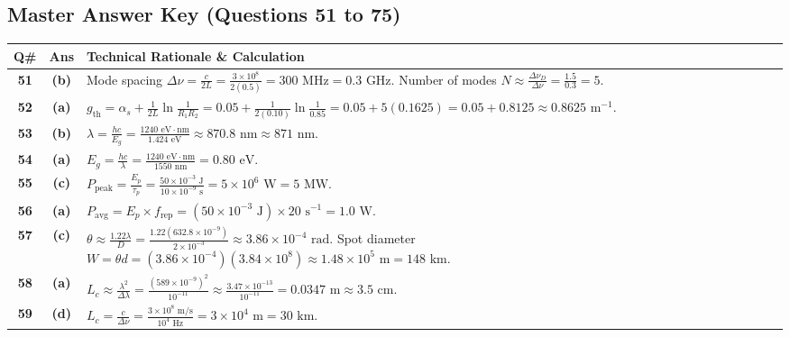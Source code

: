 \newpage

\subsection*{Master Answer Key (Questions 51 to 75)}

{\small
\noindent\begin{tabularx}{\textwidth}{|c|c|X|}
\hline
\textbf{Q\#} & \textbf{Ans} & \textbf{Technical Rationale \& Calculation} \\
\hline
\textbf{51} & \textbf{(b)} & Mode spacing $\Delta \nu = \frac{c}{2L} = \frac{3 \times 10^8}{2(0.5)} = 300\text{ MHz} = 0.3\text{ GHz}$. Number of modes $N \approx \frac{\Delta\nu_D}{\Delta\nu} = \frac{1.5}{0.3} = 5$. \\ \hline
\textbf{52} & \textbf{(a)} & $g_{\text{th}} = \alpha_s + \frac{1}{2L}\ln\frac{1}{R_1 R_2} = 0.05 + \frac{1}{2(0.10)}\ln\frac{1}{0.85} = 0.05 + 5(0.1625) = 0.05 + 0.8125 \approx 0.8625\text{ m}^{-1}$. \\ \hline
\textbf{53} & \textbf{(b)} & $\lambda = \frac{hc}{E_g} = \frac{1240\text{ eV}\cdot\text{nm}}{1.424\text{ eV}} \approx 870.8\text{ nm} \approx 871\text{ nm}$. \\ \hline
\textbf{54} & \textbf{(a)} & $E_g = \frac{hc}{\lambda} = \frac{1240\text{ eV}\cdot\text{nm}}{1550\text{ nm}} = 0.80\text{ eV}$. \\ \hline
\textbf{55} & \textbf{(c)} & $P_{\text{peak}} = \frac{E_p}{\tau_p} = \frac{50 \times 10^{-3}\text{ J}}{10 \times 10^{-9}\text{ s}} = 5 \times 10^6\text{ W} = 5\text{ MW}$. \\ \hline
\textbf{56} & \textbf{(a)} & $P_{\text{avg}} = E_p \times f_{\text{rep}} = (50 \times 10^{-3}\text{ J}) \times 20\text{ s}^{-1} = 1.0\text{ W}$. \\ \hline
\textbf{57} & \textbf{(c)} & $\theta \approx \frac{1.22\lambda}{D} = \frac{1.22(632.8 \times 10^{-9})}{2 \times 10^{-3}} \approx 3.86 \times 10^{-4}\text{ rad}$. Spot diameter $W = \theta d = (3.86 \times 10^{-4})(3.84 \times 10^8) \approx 1.48 \times 10^5\text{ m} = 148\text{ km}$. \\ \hline
\textbf{58} & \textbf{(a)} & $L_c \approx \frac{\lambda^2}{\Delta\lambda} = \frac{(589 \times 10^{-9})^2}{10^{-11}} \approx \frac{3.47 \times 10^{-13}}{10^{-11}} = 0.0347\text{ m} \approx 3.5\text{ cm}$. \\ \hline
\textbf{59} & \textbf{(d)} & $L_c = \frac{c}{\Delta\nu} = \frac{3 \times 10^8\text{ m/s}}{10^4\text{ Hz}} = 3 \times 10^4\text{ m} = 30\text{ km}$. \\ \hline

\end{tabularx}}
